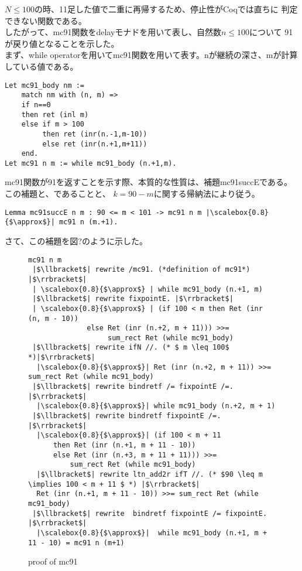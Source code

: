 \documentclass[japanese]{jssst_ppl}
\theoremstyle{definition}
\def\coqin#1{\text{\texttt{#1}}}
\begin{document}
$N \leq 100$の時、11足した値で二重に再帰するため、停止性がCoqでは直ちに
判定できない関数である。\\
したがって、mc91関数をdelayモナドを用いて表し、自然数$n \leq 100$について
91が戻り値となることを示した。\\
まず、while operatorを用いてmc91関数を用いて表す。nが継続の深さ、mが計算している値である。



\begin{verbatim}
Let mc91_body nm :=
    match nm with (n, m) =>
    if n==0
    then ret (inl m)
    else if m > 100
         then ret (inr(n.-1,m-10))
         else ret (inr(n.+1,m+11))
    end.
Let mc91 n m := while mc91_body (n.+1,m).
    \end{verbatim}

mc91関数が91を返すことを示す際、本質的な性質は、補題mc91succEである。
この補題と、\coqin{mc91 n 101 |$\approx$| Ret 91}であることと、
$ k =  90 - m $に関する帰納法により従う。



\begin{verbatim}
Lemma mc91succE n m : 90 <= m < 101 -> mc91 n m |\scalebox{0.8}{$\approx$}| mc91 n (m.+1).
\end{verbatim}

さて、この補題を図?のように示した。




\begin{figure}[H]
  \centering

  \begin{verbatim}
mc91 n m
 |$\llbracket$| rewrite /mc91. (*definition of mc91*) |$\rrbracket$|
 | \scalebox{0.8}{$\approx$} | while mc91_body (n.+1, m)
 |$\llbracket$| rewrite fixpointE. |$\rrbracket$|
 | \scalebox{0.8}{$\approx$} | (if 100 < m then Ret (inr (n, m - 10))
              else Ret (inr (n.+2, m + 11))) >>=
                   sum_rect Ret (while mc91_body)
 |$\llbracket$| rewrite ifN //. (* $ m \leq 100$ *)|$\rrbracket$|
  |\scalebox{0.8}{$\approx$}| Ret (inr (n.+2, m + 11)) >>= sum_rect Ret (while mc91_body)
 |$\llbracket$| rewrite bindretf /= fixpointE /=. |$\rrbracket$|
  |\scalebox{0.8}{$\approx$}| while mc91_body (n.+2, m + 1)
 |$\llbracket$| rewrite bindretf fixpointE /=. |$\rrbracket$|
  |\scalebox{0.8}{$\approx$}| (if 100 < m + 11
      then Ret (inr (n.+1, m + 11 - 10))
      else Ret (inr (n.+3, m + 11 + 11))) >>=
          sum_rect Ret (while mc91_body)
  |$\llbracket$| rewrite ltn_add2r ifT //. (* $90 \leq m \implies 100 < m + 11 $ *) |$\rrbracket$|
  Ret (inr (n.+1, m + 11 - 10)) >>= sum_rect Ret (while mc91_body)
 |$\llbracket$| rewrite  bindretf fixpointE /= fixpointE. |$\rrbracket$|
  |\scalebox{0.8}{$\approx$}|  while mc91_body (n.+1, m + 11 - 10) = mc91 n (m+1)

    \end{verbatim}


  \caption{proof of mc91 }
\end{figure}
\end{document}
